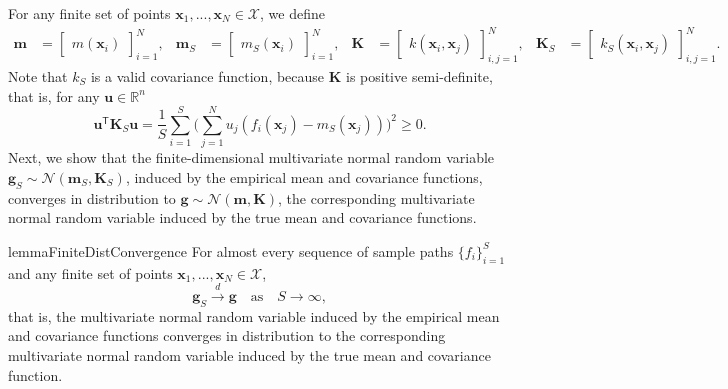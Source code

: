 \documentclass{article}
\newcommand{\K}{S}
\newcommand{\domain}{\mathcal{X}}
\newcommand{\vx}{\mathbf{x}}
\begin{document}
For any finite set of points $\vx_1, ..., \vx_N \in \domain$, we define
\begin{align*}
    \mathbf{m} &=
    \begin{bmatrix}
        m(\vx_i)
    \end{bmatrix}_{i=1}^N, &
    \mathbf{m}_\K &=
    \begin{bmatrix}
        m_\K(\vx_i)
    \end{bmatrix}_{i=1}^N, &
    \mathbf{K} &=
    \begin{bmatrix}
        k(\vx_i, \vx_j)
    \end{bmatrix}_{i,j=1}^N, &
    \mathbf{K}_\K &=
    \begin{bmatrix}
        k_\K(\vx_i, \vx_j)
    \end{bmatrix}_{i,j=1}^N.
\end{align*}
Note that $k_\K$ is a valid covariance function, because $\mathbf{K}$ is positive semi-definite, that is, for any $\mathbf{u} \in \mathbb{R}^n$
\begin{equation*}
    \mathbf{u}^\mathsf{T} \mathbf{K}_\K \mathbf{u}
    = \frac{1}{\K} \sum_{i=1}^\K \biggl( \sum_{j=1}^N u_j ( f_i(\vx_j) - m_\K(\vx_j) ) \biggr)^2 \geq 0.
\end{equation*}
Next, we show that the finite-dimensional multivariate normal random variable $\mathbf{g}_S \sim \mathcal{N}(\mathbf{m}_S, \mathbf{K}_S)$, induced by the empirical mean and covariance functions, converges in distribution to $\mathbf{g} \sim \mathcal{N}(\mathbf{m}, \mathbf{K})$, the corresponding multivariate normal random variable induced by the true mean and covariance functions.
\begin{restatable}{lemma}{FiniteDistConvergence}
\label{thm:finite_dist_convergence}
For almost every sequence of sample paths $\{ f_i \}_{i=1}^S$ and any finite set of points $\vx_1, ..., \vx_N \in \domain$,
\begin{equation*}
    \mathbf{g}_S \xrightarrow{d} \mathbf{g} \quad \text{as} \quad S \to \infty,
\end{equation*}
that is, the multivariate normal random variable induced by the empirical mean and covariance functions converges in distribution to the corresponding multivariate normal random variable induced by the true mean and covariance function.
\end{restatable}
\end{document}
